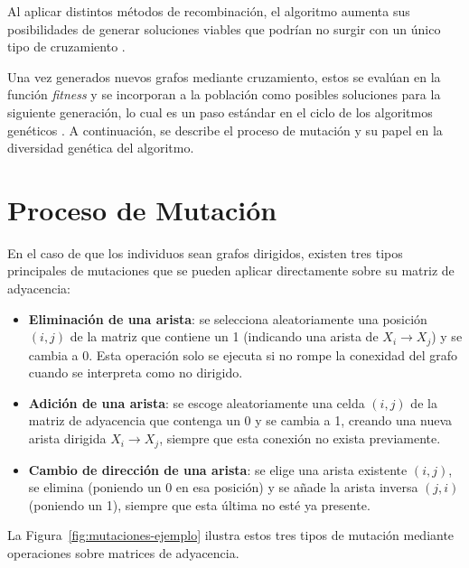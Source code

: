 Al aplicar distintos métodos de recombinación, el algoritmo aumenta sus posibilidades de generar soluciones viables que podrían no surgir con un único tipo de 
cruzamiento \cite{Eiben2015}.

Una vez generados nuevos grafos mediante cruzamiento, estos se evalúan en la función \textit{fitness} y se incorporan a la población como posibles soluciones 
para la siguiente generación, lo cual es un paso estándar en el ciclo de los algoritmos genéticos \cite{Eiben2015}. A continuación, se describe el proceso de 
mutación y su papel en la diversidad genética del algoritmo.

\section{Proceso de Mutación}
\label{sec:mut_gen}

En el caso de que los individuos sean grafos dirigidos, existen tres tipos principales de mutaciones que se pueden aplicar directamente sobre su matriz de adyacencia:

\begin{itemize}
    \item \textbf{Eliminación de una arista}: se selecciona aleatoriamente una posición $(i,j)$ de la matriz que contiene un 1 
    (indicando una arista de \(X_i \rightarrow X_j\)) y se cambia a 0. Esta operación solo se ejecuta si no rompe la conexidad del grafo cuando se interpreta como no 
    dirigido.
    
    \item \textbf{Adición de una arista}: se escoge aleatoriamente una celda $(i,j)$ de la matriz de adyacencia que contenga un 0 y se cambia a 1, creando una nueva 
    arista dirigida \(X_i \rightarrow X_j\), siempre que esta conexión no exista previamente.

    \item \textbf{Cambio de dirección de una arista}: se elige una arista existente $(i,j)$, se elimina (poniendo un 0 en esa posición) y se añade la arista inversa 
    $(j,i)$ (poniendo un 1), siempre que esta última no esté ya presente.
\end{itemize}

La Figura~\ref{fig:mutaciones-ejemplo} ilustra estos tres tipos de mutación mediante operaciones sobre matrices de adyacencia.


